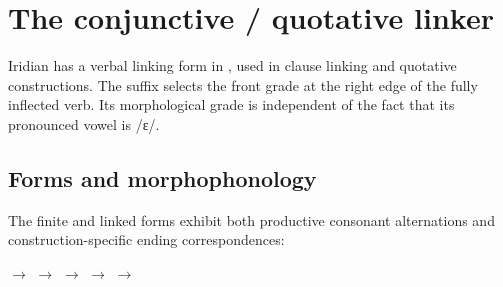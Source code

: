 \section{The conjunctive / quotative linker}\label{sec:conjunctive-linker}

Iridian has a verbal linking form in , used in clause linking and
quotative constructions. The suffix selects the front grade at the
right edge of the fully inflected verb. Its morphological grade is independent
of the fact that its pronounced vowel is /ɛ/.

\subsection{Forms and morphophonology}

The finite and linked forms exhibit both productive consonant alternations
and construction-specific ending correspondences:

\pex
\a {} $\rightarrow$ 
\a {} $\rightarrow$ 
\a {} $\rightarrow$ 
\a {} $\rightarrow$ 
\a {} $\rightarrow$ 
\xe

